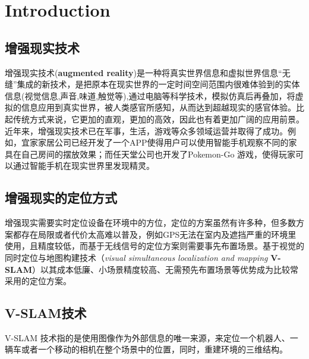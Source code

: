 \chapter{Introduction}
\section{增强现实技术}
增强现实技术(\textbf{augmented reality})是一种将真实世界信息和虚拟世界信息“无缝”集成的新技术，是把原本在现实世界的一定时间空间范围内很难体验到的实体信息(视觉信息,声音,味道,触觉等),通过电脑等科学技术，模拟仿真后再叠加，将虚拟的信息应用到真实世界，被人类感官所感知，从而达到超越现实的感官体验。比起传统方式来说，它更加的直观，更加的高效，因此也有着更加广阔的应用前景。近年来，增强现实技术已在军事，生活，游戏等众多领域运营并取得了成功。例如，宜家家居公司已经开发了一个APP使得用户可以使用智能手机观察不同的家具在自己房间的摆放效果；而任天堂公司也开发了Pokemon-Go 游戏，使得玩家可以通过智能手机在现实世界里发现精灵。

\section{增强现实的定位方式}
增强现实需要实时定位设备在环境中的方位，定位的方案虽然有许多种，但多数方案都存在局限或者代价太高难以普及，例如GPS无法在室内及遮挡严重的环境里使用，且精度较低，而基于无线信号的定位方案则需要事先布置场景。基于视觉的同时定位与地图构建技术（\textit{visual simultaneous localization and mapping} \textbf{V-SLAM}）以其成本低廉、小场景精度较高、无需预先布置场景等优势成为比较常采用的定位方案。

\section{V-SLAM技术}
V-SLAM 技术指的是使用图像作为外部信息的唯一来源，来定位一个机器人、一辆车或者一个移动的相机在整个场景中的位置，同时，重建环境的三维结构。


